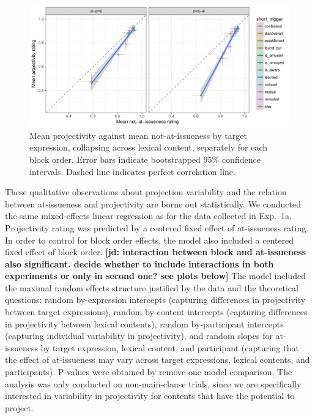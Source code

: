 \documentclass[11pt,fleqn]{article}
\newcommand{\6}{\mbox{$[\hspace*{-.6mm}[$}}
\newcommand{\9}{\mbox{$]\hspace*{-.6mm}]$}}
\newcommand{\jd}[1]{\textbf{\color{Green}[jd: #1]}}
\begin{document}
\begin{figure}[!h]

\begin{center}
\includegraphics[width=\textwidth]{../results/exp1b/graphs/ai-proj-bytrigger-byblock}
\end{center}

\caption{Mean projectivity against mean not-at-issueness by target expression, collapsing across lexical content, separately for each block order. Error bars indicate bootstrapped 95\% confidence intervals. Dashed line indicates perfect correlation line.}
\label{fig:f-proj-ai-trigg-block-1b}
\end{figure}

These qualitative observations about projection variability and the relation between at-issueness and projectivity are borne out statistically. We conducted the same mixed-effects linear regression as for the data collected in Exp.~1a. Projectivity rating was predicted by a centered fixed effect of at-issueness rating. In order to control for block order effects, the model also included a centered fixed effect of block order. \jd{interaction between block and at-issueness also significant. decide whether to include interactions in both experiments or only in second one? see plots below} The model included the maximal random effects structure justified by the data and the theoretical questions: random by-expression intercepts (capturing differences in projectivity between target expressions),  random by-content intercepts (capturing differences in projectivity between lexical contents), random by-participant intercepts (capturing individual variability in projectivity), and random slopes for at-issueness by target expression, lexical content, and participant (capturing that the effect of at-issueness may vary across target expressions, lexical contents, and participants).  P-values were obtained by remove-one model comparison. The analysis was only conducted on non-main-clause trials, since we are specifically interested in variability in projectivity for contents that have the potential to project. 
\end{document}
